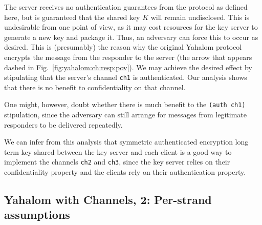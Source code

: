 The server receives no authentication guarantees from the protocol as
defined here, but is guaranteed that the shared key $K$ will remain
undisclosed.  This is undesirable from one point of view, as it may
cost resources for the key server to generate a new key and package
it.  Thus, an adversary can force this to occur as desired.  This is
(presumably) the reason why the original Yahalom protocol encrypts the
message from the responder to the server (the arrow that appears
dashed in Fig.~\ref{fig:yahalom:ch:resp:pov}).  We may achieve the
desired effect by stipulating that the server's channel \verb|ch1| is
authenticated.  Our analysis shows that there is no benefit to
confidentiality on that channel.

One might, however, doubt whether there is much benefit to the
\texttt{(auth ch1)} stipulation, since the adversary can still arrange
for messages from legitimate responders to be delivered repeatedly.

We can infer from this analysis that symmetric authenticated
encryption long term key shared between the key server and each client
is a good way to implement the channels \verb|ch2| and \verb|ch3|,
since the key server relies on their confidentiality property and the
clients rely on their authentication property.

\subsection{Yahalom with Channels, 2:  Per-strand assumptions}
\label{sec:channels:state:ch:strand:level}


